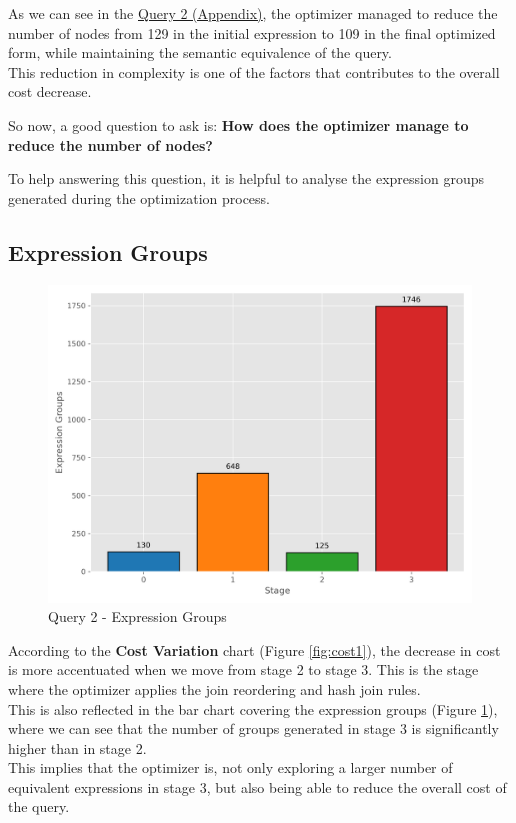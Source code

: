 \documentclass[a4paper,12pt]{scrreprt}
\begin{document}
As we can see in the \underline{\hyperref[subsec:query2]{Query 2 (Appendix)}}, the optimizer managed to reduce the number of nodes from 129 in the initial expression to 109 in the final optimized form, while maintaining the semantic equivalence of the query. \\ This reduction in complexity is one of the factors that contributes to the overall cost decrease.

So now, a good question to ask is: \textbf{How does the optimizer manage to reduce the number of nodes?} 

To help answering this question, it is helpful to analyse the expression groups generated during the optimization process. 

\subsection{Expression Groups}

\begin{figure}[H]
    \centering
    \includegraphics[width=\linewidth]{img/expression_groups/q2_expression_groups.png}
    \caption{Query 2 - Expression Groups}
    \label{fig:exprgroups2}
\end{figure}

According to the \textbf{Cost Variation} chart (Figure \ref{fig:cost1}), the decrease in cost is more accentuated when we move from stage 2 to stage 3. This is the stage where the optimizer applies the join reordering and hash join rules. \\
This is also reflected in the bar chart covering the expression groups (Figure \ref{fig:exprgroups2}), where we can see that the number of groups generated in stage 3 is significantly higher than in stage 2. \\
This implies that the optimizer is, not only exploring a larger number of equivalent expressions in stage 3, but also being able to reduce the overall cost of the query. 
\end{document}
